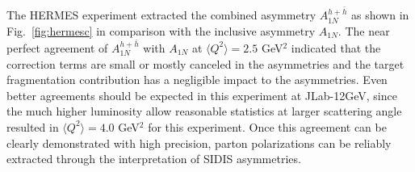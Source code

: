 The HERMES experiment extracted the combined asymmetry $A_{1N}^{h + \bar{h}}$ as shown in 
Fig.~\ref{fig:hermesc} in comparison with the inclusive asymmetry $A_{1N}$.
The near perfect agreement of $A_{1N}^{h + \bar{h}}$ with $A_{1N}$ at $\langle Q^2 \rangle =2.5$ GeV$^2$ 
indicated that the \nlo correction terms are small or mostly canceled 
in the asymmetries and the target fragmentation contribution has a negligible impact to the asymmetries. 
Even better agreements should be expected in this experiment at JLab-12GeV, since the much higher luminosity allow 
reasonable statistics at larger scattering angle resulted in $\langle Q^2 \rangle =4.0$ GeV$^2$ for this experiment.
Once this agreement can be clearly demonstrated with high precision,
parton polarizations can be reliably extracted through the \lo interpretation of SIDIS asymmetries.  

